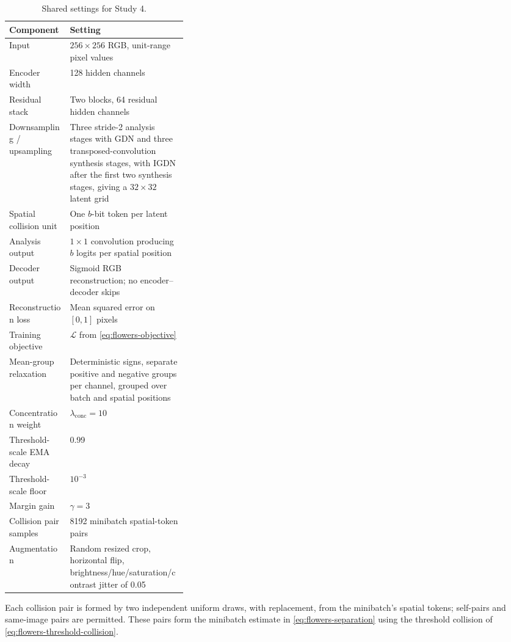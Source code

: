\begin{table}[htbp]
\centering\small
\begin{tabularx}{\linewidth}{>{\raggedright\arraybackslash}p{0.34\linewidth}X}
\toprule
Component & Setting \\
\midrule
Input & $256\times256$ RGB, unit-range pixel values \\
Encoder width & 128 hidden channels \\
Residual stack & Two blocks, 64 residual hidden channels \\
Downsampling / upsampling & Three stride-2 analysis stages with GDN and three transposed-convolution synthesis stages, with IGDN after the first two synthesis stages, giving a $32\times32$ latent grid \\
Spatial collision unit & One $b$-bit token per latent position \\
Analysis output & $1\times1$ convolution producing $b$ logits per spatial position \\
Decoder output & Sigmoid RGB reconstruction; no encoder--decoder skips \\
Reconstruction loss & Mean squared error on $[0,1]$ pixels \\
Training objective & $\mathcal L$ from \cref{eq:flowers-objective} \\
Mean-group relaxation & Deterministic signs, separate positive and negative groups per channel, grouped over batch and spatial positions \\
Concentration weight & $\lambda_{\mathrm{conc}}=10$ \\
Threshold-scale EMA decay & 0.99 \\
Threshold-scale floor & $10^{-3}$ \\
Margin gain & $\gamma=3$ \\
Collision pair samples & 8192 minibatch spatial-token pairs \\
Augmentation & Random resized crop, horizontal flip, brightness/hue/saturation/contrast jitter of 0.05 \\
\bottomrule
\end{tabularx}
\caption{Shared settings for Study 4.}
\label{tab:flowers102-shared-settings}
\end{table}
Each collision pair is formed by two independent uniform draws, with replacement, from the minibatch's spatial tokens; self-pairs and same-image pairs are permitted.
These pairs form the minibatch estimate in \cref{eq:flowers-separation} using the threshold collision of \cref{eq:flowers-threshold-collision}.

